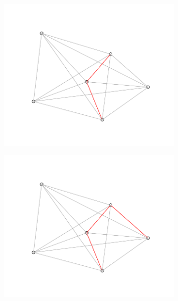 \begin{figure}[h]
\begin{subfigure}{0.25\textwidth}
  \includegraphics[width=\linewidth]{./pictures/4/triangulation_3.pdf}
  \label{fig:3-triangulation_3}
\end{subfigure}\hfil %
\begin{subfigure}{0.25\textwidth}
  \includegraphics[width=\linewidth]{./pictures/4/triangulation_4.pdf}
  \label{fig:3-triangulation_4}
\end{subfigure}\hfil %
\begin{subfigure}{0.25\textwidth}

\end{subfigure}
\end{figure}
